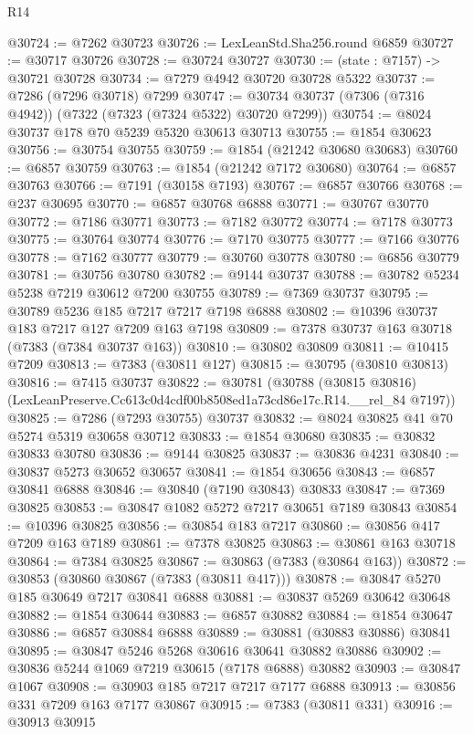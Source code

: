 \begin{lexlean}{R14}
\begin{coremodule}
@30724 := @7262 @30723
@30726 := LexLeanStd.Sha256.round @6859
@30727 := @30717 @30726
@30728 := @30724 @30727
@30730 := (state : @7157) -> @30721 @30728
@30734 := @7279 @4942 @30720 @30728 @5322
@30737 := @7286 (@7296 @30718) @7299
@30747 := @30734 @30737 (@7306 (@7316 @4942)) (@7322 (@7323 (@7324 @5322) @30720 @7299))
@30754 := @8024 @30737 @178 @70 @5239 @5320 @30613 @30713
@30755 := @1854 @30623
@30756 := @30754 @30755
@30759 := @1854 (@21242 @30680 @30683)
@30760 := @6857 @30759
@30763 := @1854 (@21242 @7172 @30680)
@30764 := @6857 @30763
@30766 := @7191 (@30158 @7193)
@30767 := @6857 @30766
@30768 := @237 @30695
@30770 := @6857 @30768 @6888
@30771 := @30767 @30770
@30772 := @7186 @30771
@30773 := @7182 @30772
@30774 := @7178 @30773
@30775 := @30764 @30774
@30776 := @7170 @30775
@30777 := @7166 @30776
@30778 := @7162 @30777
@30779 := @30760 @30778
@30780 := @6856 @30779
@30781 := @30756 @30780
@30782 := @9144 @30737
@30788 := @30782 @5234 @5238 @7219 @30612 @7200 @30755
@30789 := @7369 @30737
@30795 := @30789 @5236 @185 @7217 @7217 @7198 @6888
@30802 := @10396 @30737 @183 @7217 @127 @7209 @163 @7198
@30809 := @7378 @30737 @163 @30718 (@7383 (@7384 @30737 @163))
@30810 := @30802 @30809
@30811 := @10415 @7209
@30813 := @7383 (@30811 @127)
@30815 := @30795 (@30810 @30813)
@30816 := @7415 @30737
@30822 := @30781
    (@30788 (@30815 @30816) (LexLeanPreserve.Cc613c0d4cdf00b8508ed1a73cd86e17c.R14.__rel_84 @7197))
@30825 := @7286 (@7293 @30755) @30737
@30832 := @8024 @30825 @41 @70 @5274 @5319 @30658 @30712
@30833 := @1854 @30680
@30835 := @30832 @30833 @30780
@30836 := @9144 @30825
@30837 := @30836 @4231
@30840 := @30837 @5273 @30652 @30657
@30841 := @1854 @30656
@30843 := @6857 @30841 @6888
@30846 := @30840 (@7190 @30843) @30833
@30847 := @7369 @30825
@30853 := @30847 @1082 @5272 @7217 @30651 @7189 @30843
@30854 := @10396 @30825
@30856 := @30854 @183 @7217
@30860 := @30856 @417 @7209 @163 @7189
@30861 := @7378 @30825
@30863 := @30861 @163 @30718
@30864 := @7384 @30825
@30867 := @30863 (@7383 (@30864 @163))
@30872 := @30853 (@30860 @30867 (@7383 (@30811 @417)))
@30878 := @30847 @5270 @185 @30649 @7217 @30841 @6888
@30881 := @30837 @5269 @30642 @30648
@30882 := @1854 @30644
@30883 := @6857 @30882
@30884 := @1854 @30647
@30886 := @6857 @30884 @6888
@30889 := @30881 (@30883 @30886) @30841
@30895 := @30847 @5246 @5268 @30616 @30641 @30882 @30886
@30902 := @30836 @5244 @1069 @7219 @30615 (@7178 @6888) @30882
@30903 := @30847 @1067
@30908 := @30903 @185 @7217 @7217 @7177 @6888
@30913 := @30856 @331 @7209 @163 @7177 @30867
@30915 := @7383 (@30811 @331)
@30916 := @30913 @30915

\end{coremodule}
\end{lexlean}
